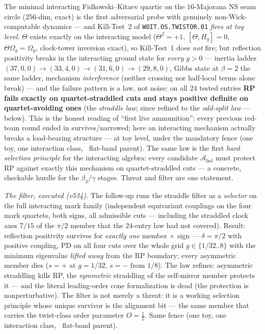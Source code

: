 \documentclass[11pt,a4paper]{article}
\begin{document}
\begin{gapbox}
The minimal interacting Fidkowski--Kitaev quartic on the $16$-Majorana NS seam circle
($256$-dim, exact) is the first adversarial probe with genuinely non-Wick-computable dynamics
--- and Kill-Test~2 of \texttt{WOIT.OS.TWISTOR.01} \emph{fires at toy level}. $\Theta$ exists
exactly on the interacting model ($\Theta^2={+}1$, $[\Theta,H_g]=0$, $\Theta\Omega_g=\Omega_g$,
clock-tower inversion exact), so Kill-Test~1 does \emph{not} fire; but reflection positivity
breaks in the interacting ground state for \emph{every} $g>0$ --- inertia ladder
$(37,0,0)\to(33,4,0)\to(31,6,0)\to(29,8,0)$, Gibbs state at $\beta=2$ the same ladder, mechanism
\emph{interference} (neither crossing nor half-local terms alone break) --- and the failure
pattern is a law, not noise: on all $24$ tested entries \textbf{RP fails exactly on
quartet-straddled cuts and stays positive definite on quartet-avoiding ones} (the
\emph{straddle law}; since refined to the \emph{odd-split law} --- below). This is the honest reading of ``first live ammunition'': every previous
red-team round ended in survives/narrowed; here an interacting mechanism actually breaks a
load-bearing structure --- at toy level, under the mandatory fence (one toy, one interaction
class, \mC\ flat-band parent). The same law is the first \emph{hard selection principle} for the
interacting algebra: every candidate $\mathcal A_{\mathrm{hol}}$ must protect RP against exactly
this mechanism on quartet-straddled cuts --- a concrete, checkable hurdle for the $\beta_3/\gamma$
stages. Threat and filter are one statement. 

\smallskip\noindent\emph{The filter, executed (v534).} The follow-up runs the straddle filter as a
\emph{selector} on the full interacting mark family (independent equivariant couplings on the four
mark quartets, both signs, all admissible cuts --- including the straddled clock axes $7/15$ of the
$\pi/2$ member that the $24$-entry law had not covered). Result: reflection positivity survives for
\emph{exactly one} member $\times$ sign --- $\delta=\pi/2$ with positive coupling, PD on all four
cuts over the whole grid $g\in\{1/32..8\}$ with the minimum eigenvalue \emph{lifted away} from the
RP boundary; every asymmetric member dies ($s{=}+$ at $g=1/32$, $s{=}-$ from $1/8$). The law
refines: asymmetric straddling kills RP, the \emph{symmetric} straddling of the self-mirror member
protects it --- and the literal leading-order cone formalization is dead (the protection is
nonperturbative). The filter is not merely a threat: it is a working selection principle whose
unique survivor is the alignment bit --- the same member that carries the twist-class order
parameter $O=\tfrac12$. Same fence (one toy, one interaction class, \mC\ flat-band parent).


\end{gapbox}
\end{document}
